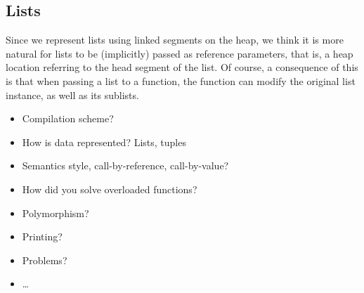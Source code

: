 \subsection{Lists}
Since we represent lists using linked segments on the heap, we think it is more
natural for lists to be (implicitly) passed as reference parameters, that is, a
heap location referring to the head segment of the list.
Of course, a consequence of this is that when passing a list to a function, the
function can modify the original list instance, as well as its sublists.








\begin{todoenv}
  \begin{itemize}
    \item Compilation scheme?
    \item How is data represented? Lists, tuples
    \item Semantics style, call-by-reference, call-by-value?
    \item How did you solve overloaded functions?
    \item Polymorphism?
    \item Printing?
    \item Problems?
    \item\ldots
  \end{itemize}
\end{todoenv}
